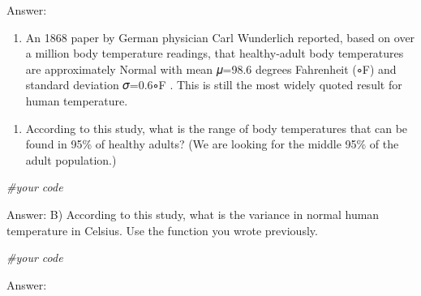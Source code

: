 \documentclass[
]{article}
\newenvironment{Shaded}{\begin{snugshade}}{\end{snugshade}}
\newcommand{\CommentTok}[1]{\textcolor[rgb]{0.56,0.35,0.01}{\textit{#1}}}
\providecommand{\tightlist}{%
  \setlength{\itemsep}{0pt}\setlength{\parskip}{0pt}}
\begin{document}
Answer:

\begin{enumerate}
\def\labelenumi{\arabic{enumi}.}
\setcounter{enumi}{10}
\tightlist
\item
  An 1868 paper by German physician Carl Wunderlich reported, based on
  over a million body temperature readings, that healthy‑adult body
  temperatures are approximately Normal with mean 𝜇=98.6 degrees
  Fahrenheit (∘F) and standard deviation 𝜎=0.6∘F . This is still the
  most widely quoted result for human temperature.
\end{enumerate}

\begin{enumerate}
\def\labelenumi{\Alph{enumi})}
\tightlist
\item
  According to this study, what is the range of body temperatures that
  can be found in 95\% of healthy adults? (We are looking for the middle
  95\% of the adult population.)
\end{enumerate}

\begin{Shaded}
\begin{Highlighting}[]
\CommentTok{\#your code}
\end{Highlighting}
\end{Shaded}

Answer: B) According to this study, what is the variance in normal human
temperature in Celsius. Use the function you wrote previously.

\begin{Shaded}
\begin{Highlighting}[]
\CommentTok{\#your code}
\end{Highlighting}
\end{Shaded}

Answer:
\end{document}
